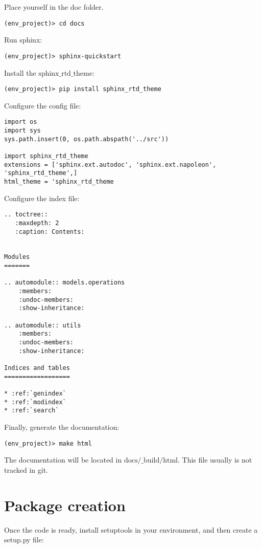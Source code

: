 \documentclass[24pt]{article}
\begin{document}
Place yourself in the doc folder.

\begin{lstlisting}
(env_project)> cd docs
\end{lstlisting}

Run sphinx:

\begin{lstlisting}
(env_project)> sphinx-quickstart
\end{lstlisting}


Install the $\text{sphinx\_rtd\_theme}$:
\begin{lstlisting}
(env_project)> pip install sphinx_rtd_theme
\end{lstlisting}


Configure the config file:

\begin{lstlisting}
import os
import sys
sys.path.insert(0, os.path.abspath('../src'))

import sphinx_rtd_theme
extensions = ['sphinx.ext.autodoc', 'sphinx.ext.napoleon', 'sphinx_rtd_theme',]
html_theme = 'sphinx_rtd_theme
\end{lstlisting}

Configure the index file:

\begin{lstlisting}
.. toctree::
   :maxdepth: 2
   :caption: Contents:


Modules
=======

.. automodule:: models.operations
    :members:
    :undoc-members:
    :show-inheritance:

.. automodule:: utils
    :members:
    :undoc-members:
    :show-inheritance:

Indices and tables
==================

* :ref:`genindex`
* :ref:`modindex`
* :ref:`search`
\end{lstlisting}


Finally, generate the documentation:
\begin{lstlisting}
(env_project)> make html
\end{lstlisting}

The documentation will be located in 
$\text{docs/\_build/html}$. This file usually is not tracked in git.


\section{Package creation}

Once the code is ready, install setuptools in your environment, and then create a setup.py file: 
\end{document}
